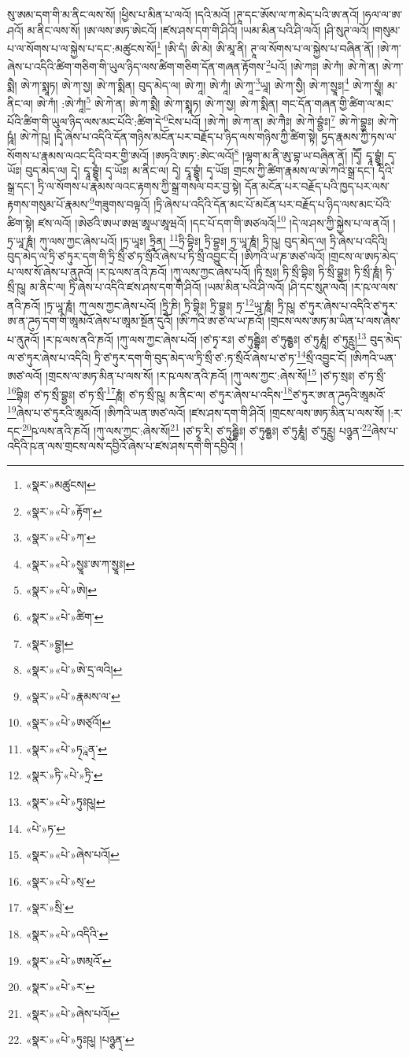 སུ་ཨམ་དག་གི་མ་ནིང་ལས་སོ། །ཕྱིས་པ་མིན་པ་ལའོ། །དའི་མའོ། །ཊཱ་དང་ཨོས་ལ་ཀ་མེད་པའི་ཨ་ནའོ། །ཧལ་ལ་ཨ་ཤའོ། མ་ནིང་ལས་སོ། །ཨ་ལས་ཨཏ་ཨེངའོ། །ཛས་ཤས་དག་གི་ཤིའོ། །ཡམ་མིན་པའི་ཤི་ལའོ། །ཤི་སུཊ་ལའོ། །གསུམ་པ་ལ་སོགས་པ་ལ་སྐྱེས་པ་དང་:མཚུངས་སོ།\footnote{«སྣར་»མཚུངས།} །ཨི་དཾ། ཨི་མེ། ཨི་མཱ་ནི། ཊཱ་ལ་སོགས་པ་ལ་སྐྱེས་པ་བཞིན་ནོ། །ཨེ་ཀ་ཞེས་པ་འདིའི་ཚིག་གཅིག་གི་ཡུལ་ཉིད་ལས་ཚིག་གཅིག་དོན་གཞན་རྟོགས་\footnote{«སྣར་»«པེ་»རྟོག་}པའོ། །ཨེ་ཀཿ། ཨེ་ཀཾ། ཨེ་ཀེ་ན། ཨེ་ཀ་སྨཻ། ཨེ་ཀ་སྨཱཏ། ཨེ་ཀ་སྱ། ཨེ་ཀ་སྨིན། བུད་མེད་ལ། ཨེ་ཀཱ། ཨེ་ཀཱཾ། ཨེ་ཀཱ་\footnote{«སྣར་»«པེ་»ཀ་}ཡཱ། ཨེ་ཀ་སྱཻ། ཨེ་ཀ་སྱཱཿ།\footnote{«སྣར་»«པེ་»སྱཱཿ་ཨ་ཀ་སྱཱཿ།} ཨེ་ཀ་སྱཱཾ། མ་ནིང་ལ། ཨེ་ཀཾ། :ཨེ་ཀཱཾ།\footnote{«སྣར་»«པེ་»ཨེ།} ཨེ་ཀེ་ན། ཨེ་ཀ་སྨཻ། ཨེ་ཀ་སྨཱཏ། ཨེ་ཀ་སྱ། ཨེ་ཀ་སྨིན། གང་དོན་གཞན་གྱི་ཚིག་ལ་མང་པོའི་ཚིག་གི་ཡུལ་ཉིད་ལས་མང་པོའི་:ཚིག་དེ་\footnote{«སྣར་»«པེ་»ཚིག་}ངེས་པའོ། །ཨེ་ཀེ། ཨེ་ཀ་ན། ཨེ་ཀཻཿ། ཨེ་ཀེ་བྷྱཾཿ།\footnote{«སྣར་»བྷྱ།} ཨེ་ཀེ་བྷྱཿ། ཨེ་ཀེ་ཥཱཾ། ཨེ་ཀེ་ཥུ། །དྭི་ཞེས་པ་འདིའི་དོན་གཉིས་མངོན་པར་བརྗོད་པ་ཉིད་ལས་གཉིས་ཀྱི་ཚིག་སྟེ། ཏྱད་རྣམས་ཀྱི་ཏས་ལ་སོགས་པ་རྣམས་ལའང་དྭིའི་བར་གྱི་ཨའོ། །ཨཏའི་ཨཏ་:ཨེང་ལའོ།\footnote{«སྣར་»«པེ་»ཨེ་དྲ་ལའི།} །ལྷག་མ་ནི་ཨུ་བྷ་ཡ་བཞིན་ནོ། །དྭཽ། དྭཱ་བྷྱཱཾ། དྭ་ཡོཿ། བུད་མེད་ལ། དྭེ། དྭཱ་བྷྱཱཾ། དྭ་ཡོཿ། མ་ནིང་ལ། དྭེ། དྭཱ་བྷྱཱཾ། དྭ་ཡོཿ། གྲངས་ཀྱི་ཚིག་རྣམས་ལ་ཨེ་ཀའི་སྒྲ་དང་། དྭིའི་སྒྲ་དང་། ཏྲི་ལ་སོགས་པ་རྣམས་ལའང་རྟགས་ཀྱི་སྒྲ་གསལ་བར་བྱ་སྟེ། དོན་མངོན་པར་བརྗོད་པའི་ཁྱད་པར་ལས་རྟགས་གསུམ་པོ་རྣམས་\footnote{«སྣར་»«པེ་»རྣམས་ལ་}གཟུགས་བལྟའོ། །ཏྲི་ཞེས་པ་འདིའི་དོན་མང་པོ་མངོན་པར་བརྗོད་པ་ཉིད་ལས་མང་པོའི་ཚིག་སྟེ། ཛས་ལའོ། །ཨེཙའི་ཨཡ་ཨཝ་ཨཱཡ་ཨཱཝའོ། །དང་པོ་དག་གི་ཨཙལའོ།\footnote{«སྣར་»«པེ་»ཨཙ྄འོ།} །དེ་ལ་ཤས་ཀྱི་སྐྱེས་པ་ལ་ནའོ། །ཏྲ་ཡཱ་ཎཱཾ། ཀུ་ལས་ཀྱང་ཞེས་པའོ། །ཏྲ་ཡཱཿ། ཏྲཱིན། \footnote{«སྣར་»«པེ་»ཏ྄ཱན྄་}ཏྲི་བྷིཿ། ཏྲི་བྷྱཿ། ཏྲ་ཡཱ་ཎཱཾ། ཏྲི་ཥུ། བུད་མེད་ལ། ཏྲི་ཞེས་པ་འདིའི། བུད་མེད་ལ་ཏྲི་ཙ་ཏུར་དག་གི་ཏྲི་སྲྀ་ཙ་ཏ་སྲྀའོ་ཞེས་པ་ཏི་སྲྀ་འབྱུང་ངོ། །ཨིཀའི་ཡ་ཎ་ཨཙ་ལའོ། །གྲངས་ལ་ཨཏ་མེད་པ་ལས་སོ་ཞེས་པ་ནུཊའོ། །ར་ཥ་ལས་ནའི་ཎའོ། །ཀུ་ལས་ཀྱང་ཞེས་པའོ། །ཏི་སྲཿ། ཏི་སྲྀ་བྷིཿ། ཏི་སྲྀ་བྷྱཿ། ཏི་སྲྀ་ཎཱཾ། ཏི་སྲྀ་ཥུ། མ་ནིང་ལ། ཏྲི་ཞེས་པ་འདིའི་ཛས་ཤས་དག་གི་ཤིའོ། །ཡམ་མིན་པའི་ཤི་ལའོ། །ཤི་དང་སུཊ་ལའོ། །ར་ཥ་ལ་ལས་ནའི་ཎའོ། །ཏྲ་ཡཱ་ཎཱཾ། ཀུ་ལས་ཀྱང་ཞེས་པའོ། །ཏྲཱི་ཎི། ཏྲི་བྷིཿ། ཏྲི་བྷྱཿ། ཏྲ་\footnote{«སྣར་»ཏི་«པེ་»ཏྲི་}ཡཱ་ཎཱཾ། ཏྲི་ཥུ། ཙ་ཏུར་ཞེས་པ་འདིའི་ཙ་ཏུར་ཨ་ན་ཌུཧ་དག་གི་ཨཱམའོ་ཞེས་པ་ཨཱམ་སྔོན་དུའོ། །ཨི་ཀའི་ཨ་ཙ་ལ་ཡ་ཎའོ། །གྲངས་ལས་ཨཏ་མ་ཡིན་པ་ལས་ཞེས་པ་ནུཊའོ། །ར་ཥ་ལས་ནའི་ཎའོ། །ཀུ་ལས་ཀྱང་ཞེས་པའོ། །ཙ་ཏྭ་རཿ། ཙ་ཏུརྦྷིཿ། ཙ་ཏུརྦྷྱཿ། ཙ་ཏུརྞཱཾ། ཙ་ཏུཪྵུ།\footnote{«སྣར་»«པེ་»ཏུཿཥུ།} བུད་མེད་ལ་ཙ་ཏུར་ཞེས་པ་འདིའི། ཏྲི་ཙ་ཏུར་དག་གི་བུད་མེད་ལ་ཏྲི་སྲྀ་ཙ་:ཏ་སྲྀའོ་ཞེས་པ་ཙ་ཏ་\footnote{«པེ་»ཏ་}སྲྀ་འབྱུང་ངོ། །ཨིཀའི་ཡན་ཨཙ་ལའོ། །གྲངས་ལ་ཨཏ་མིན་པ་ལས་སོ། །ར་ཥ་ལས་ནའི་ཎའོ། །ཀུ་ལས་ཀྱང་:ཞེས་སོ།\footnote{«སྣར་»«པེ་»ཞེས་པའོ།} །ཙ་ཏ་སྲཿ། ཙ་ཏ་སྲྀ་\footnote{«སྣར་»«པེ་»ས྄་}བྷིཿ། ཙ་ཏ་སྲྀ་བྷྱཿ། ཙ་ཏ་སྲྀ་\footnote{«སྣར་»སྲི་}ཎཱཾ། ཙ་ཏ་སྲྀ་ཥུ། མ་ནིང་ལ། ཙ་ཏུར་ཞེས་པ་འདིས་\footnote{«སྣར་»«པེ་»འདིའི་}ཙ་ཏུར་ཨ་ན་ཌུཧའི་ཨཱམའོ་\footnote{«སྣར་»«པེ་»ཨམ྄འོ་}ཞེས་པ་ཙ་ཏུརའི་ཨཱམའོ། །ཨིཀའི་ཡན་ཨཙ་ལའོ། །ཛས་ཤས་དག་གི་ཤིའོ། །གྲངས་ལས་ཨཏ་མིན་པ་ལས་སོ། །:ར་དང་\footnote{«སྣར་»«པེ་»ར་}ཥ་ལས་ནའི་ཎའོ། །ཀུ་ལས་ཀྱང་:ཞེས་སོ།\footnote{«སྣར་»«པེ་»ཞེས་པའོ།} །ཙ་ཏྭཱ་རི། ཙ་ཏུརྦྷིཿ། ཙ་ཏུརྦྷྱཿ། ཙ་ཏུརྞཱཾ། ཙ་ཏུཪྵུ། པཉྩན་\footnote{«སྣར་»«པེ་»ཏུཿཥུ། །པཉྩན྄་}ཞེས་པ་འདིའི་ཥ་ན་ལས་གྲངས་ལས་དབྱིའོ་ཞེས་པ་ཛས་ཤས་དག་གི་དབྱིའོ། །
